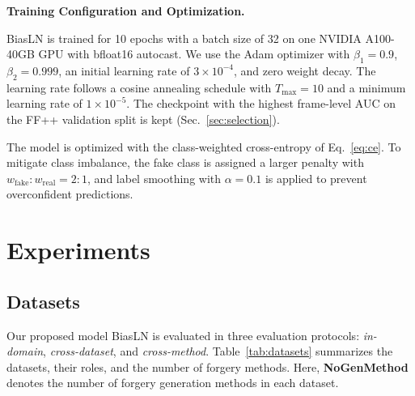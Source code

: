 \documentclass[fonts]{icst}
\newif\ifrevmark\revmarkfalse
\newcommand{\rev}[1]{\ifrevmark{\color{revblue}#1}\else#1\fi}
\begin{document}
\noindent\textbf{Training Configuration and Optimization.}\par
BiasLN is trained for 10 epochs with a batch size of 32 on \rev{one NVIDIA A100-40GB GPU with bfloat16 autocast}.
We use the Adam optimizer with $\beta_1 = 0.9$, $\beta_2 = 0.999$, an initial learning rate of $3 \times 10^{-4}$, and zero weight decay.
The learning rate follows a cosine annealing schedule with $T_{\max}=10$ and a minimum learning rate of $1 \times 10^{-5}$.
\rev{The checkpoint with the highest frame-level AUC on the FF++ validation split is kept (Sec.~\ref{sec:selection}).}

The model is optimized with \rev{the} class-weighted cross-entropy \rev{of Eq.~\eqref{eq:ce}}. To mitigate class imbalance, the fake class is assigned a larger penalty with $w_{\mathrm{fake}}:w_{\mathrm{real}} = 2:1$, and label smoothing with $\alpha = 0.1$ is applied to prevent overconfident predictions.


\section{Experiments}
\subsection{Datasets}
\label{sec:datasets}
\label{sec:protocol}

Our proposed model BiasLN \rev{is} evaluated in three evaluation protocols: \textit{in-domain}, \textit{cross-dataset}, and \textit{cross-method}.
Table~\ref{tab:datasets} summarizes the datasets, their roles, and the number of forgery methods.
Here, \textbf{NoGenMethod} denotes the number of forgery generation methods in each dataset.
\end{document}
